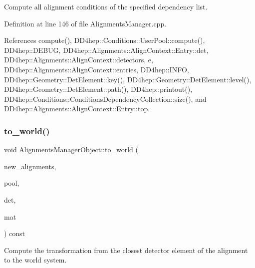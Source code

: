 Compute all alignment conditions of the specified dependency list. 



Definition at line 146 of file Alignments\+Manager.\+cpp.



References compute(), D\+D4hep\+::\+Conditions\+::\+User\+Pool\+::compute(), D\+D4hep\+::\+D\+E\+B\+UG, D\+D4hep\+::\+Alignments\+::\+Align\+Context\+::\+Entry\+::det, D\+D4hep\+::\+Alignments\+::\+Align\+Context\+::detectors, e, D\+D4hep\+::\+Alignments\+::\+Align\+Context\+::entries, D\+D4hep\+::\+I\+N\+FO, D\+D4hep\+::\+Geometry\+::\+Det\+Element\+::key(), D\+D4hep\+::\+Geometry\+::\+Det\+Element\+::level(), D\+D4hep\+::\+Geometry\+::\+Det\+Element\+::path(), D\+D4hep\+::printout(), D\+D4hep\+::\+Conditions\+::\+Conditions\+Dependency\+Collection\+::size(), and D\+D4hep\+::\+Alignments\+::\+Align\+Context\+::\+Entry\+::top.

\hypertarget{class_d_d4hep_1_1_alignments_1_1_alignments_manager_object_a174020db33ce71eebaf24fb0be805fa0}{}\label{class_d_d4hep_1_1_alignments_1_1_alignments_manager_object_a174020db33ce71eebaf24fb0be805fa0} 
\subsubsection{\texorpdfstring{to\+\_\+world()}{to\_world()}}
{\footnotesize\ttfamily void Alignments\+Manager\+Object\+::to\+\_\+world (\begin{DoxyParamCaption}\item[{\hyperlink{class_d_d4hep_1_1_alignments_1_1_align_context}{Align\+Context} \&}]{new\+\_\+alignments,  }\item[{\hyperlink{class_d_d4hep_1_1_conditions_1_1_user_pool}{User\+Pool} \&}]{pool,  }\item[{\hyperlink{class_d_d4hep_1_1_geometry_1_1_det_element}{Det\+Element}}]{det,  }\item[{T\+Geo\+H\+Matrix \&}]{mat }\end{DoxyParamCaption}) const\hspace{0.3cm}{\ttfamily [protected]}}



Compute the transformation from the closest detector element of the alignment to the world system. 



